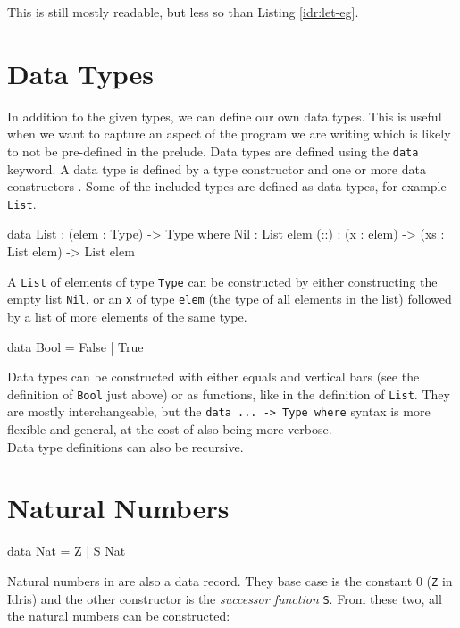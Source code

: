     This is still mostly readable, but less so than Listing \ref{idr:let-eg}.
    

\section{Data Types}
    In addition to the given types, we can define our own data types. This is useful when we want to capture an aspect of the program we are writing which is likely to not be pre-defined in the \Idris prelude. Data types are defined using the \texttt{data} keyword. A data type is defined by a type constructor and one or more data constructors \cite{brady_2017}. Some of the included types are defined as data types, for example \texttt{List}.
    
    \begin{code}[caption={\texttt{List} as defined in the \Idris prelude}]
        data List : (elem : Type) -> Type where
            Nil  : List elem
            (::) : (x : elem) -> (xs : List elem) -> List elem 
    \end{code}
    A \texttt{List} of elements of type \texttt{Type} can be constructed by either constructing the empty list \texttt{Nil}, or an \texttt{x} of type \texttt{elem} (the type of all elements in the list) followed by a list of more elements of the same type.
    
    \begin{code}[caption={\texttt{Bool} as defined in the \Idris prelude}]
        data Bool = False
                  | True
    \end{code}
    Data types can be constructed with either equals and vertical bars (see the definition of \texttt{Bool} just above) or as functions, like in the definition of \texttt{List}. They are mostly interchangeable, but the \texttt{data ... -> Type where} syntax is more flexible and general, at the cost of also being more verbose.
    \\
    
    Data type definitions can also be recursive.


\section{Natural Numbers}\label{des:nats}
    \begin{code}[caption={Natural numbers as defined in the \Idris prelude}]
        data Nat = Z | S Nat
    \end{code}

    Natural numbers in \Idris are also a data record. They base case is the constant 0 (\texttt{Z} in Idris) and the other constructor is the \textit{successor function} \texttt{S}. From these two, all the natural numbers can be constructed:
    

